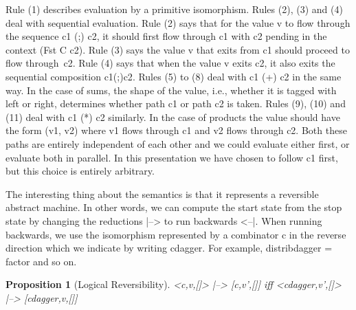 \documentclass[preprint]{sigplanconf}
\newtheorem{proposition}[theorem]{Proposition}
\begin{document}
\begin{scriptsize}
\end{scriptsize}
Rule (1) describes evaluation by a primitive isomorphism. Rules (2), (3) and
(4) deal with sequential evaluation. Rule (2) says that for the value {{v}}
to flow through the sequence {{c1 (;) c2}}, it should first flow through
{{c1}} with {{c2}} pending in the context ({{Fst C c2}}). Rule (3) says the
value {{v}} that exits from {{c1}} should proceed to flow
through~{{c2}}. Rule (4) says that when the value {{v}} exits {{c2}}, it also
exits the sequential composition {{c1(;)c2}}. Rules (5) to (8) deal with 
{{c1 (+) c2}} in the same way. In the case of sums, the shape of the value,
i.e., whether it is tagged with {{left}} or {{right}}, determines whether
path {{c1}} or path {{c2}} is taken. Rules (9), (10) and (11) deal with 
{{c1 (*) c2}} similarly. In the case of products the value should have the
form {{(v1, v2)}} where {{v1}} flows through {{c1}} and {{v2}} flows through
{{c2}}. Both these paths are entirely independent of each other and we could
evaluate either first, or evaluate both in parallel. In this presentation we
have chosen to follow {{c1}} first, but this choice is entirely arbitrary.

The interesting thing about the semantics is that it represents a reversible
abstract machine. In other words, we can compute the start state from the
stop state by changing the reductions {{|-->}} to run backwards
{{<--|}}. When running backwards, we use the isomorphism represented by a
combinator {{c}} in the reverse direction which we indicate by writing
{{c{dagger}}}. For example, {{distrib{dagger} = factor}} and so on.

\begin{proposition}[Logical Reversibility]
\label{prop:logrev}
{{<c,v,[]> |--> [c,v',[]]}} iff 
{{<c{dagger},v',[]> |--> [c{dagger},v,[]]}} 
\end{proposition}
\end{document}
